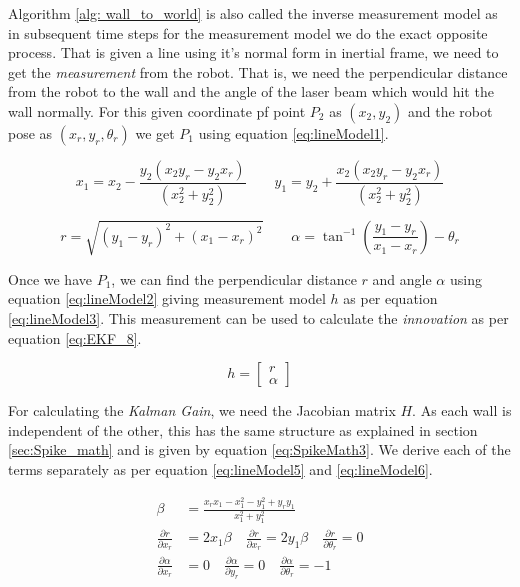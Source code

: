 Algorithm \ref{alg: wall_to_world} is also called the inverse measurement model as in subsequent time steps for the measurement model we do the exact opposite process. That is given a line using it's normal form in inertial frame, we need to get the \textit{measurement} from the robot. That is, we need the perpendicular distance from the robot to the wall and the angle of the laser beam which would hit the wall normally. For this given coordinate pf point $ P_2 $ as $ (x_2,y_2) $ and the robot pose as $ (x_r,y_r,\theta_r) $ we get $ P_1 $ using equation \ref{eq:lineModel1}. 

\begin{equation}
	\label{eq:lineModel1}
	x_1 = x_2 - \frac{y_2 ( x_2 y_ r- y_2 x_r)}{(x_2^2 + y_2^2)}
	\qquad
	y_1 = y_2 + \frac{x_2 ( x_2 y_ r- y_2 x_r)}{(x_2^2 + y_2^2)}
\end{equation}

\begin{equation}
	\label{eq:lineModel2}
	r=\sqrt{(y_1-y_r)^2+(x_1-x_r)^2}
	\qquad
	\alpha = \tan^{-1}\left(\frac{y_1-y_r}{x_1-x_r}\right)-\theta_r
\end{equation}

Once we have $ P_1 $, we can find the perpendicular distance $ r $ and angle $ \alpha $ using equation \ref{eq:lineModel2} giving measurement model $ h $ as per equation \ref{eq:lineModel3}. This measurement can be used to calculate the \textit{innovation} as per equation \ref{eq:EKF_8}. 

\begin{equation}
	\label{eq:lineModel3}
	h=\begin{bmatrix}
	r\\\alpha
	\end{bmatrix}
\end{equation}

For calculating the \textit{Kalman Gain}, we need the Jacobian matrix $ H $. As each wall is independent of the other, this has the same structure as explained in section \ref{sec:Spike_math} and is given by equation \ref{eq:SpikeMath3}. We derive each of the terms separately as per equation \ref{eq:lineModel5} and \ref{eq:lineModel6}.  

\begin{subequations}
\label{eq:lineModel5}
	\begin{align}
	\beta &= \frac{x_rx_1-x_1^2-y_1^2+y_ry_1}{x_1^2+y_1^2}\\
	\frac{\partial r}{\partial x_r} &= 2x_1\beta \quad
	\frac{\partial r}{\partial x_r} = 2y_1\beta \quad
	\frac{\partial r}{\partial \theta_r} = 0 \\
	\frac{\partial \alpha}{\partial x_r} &= 0 \quad 
	\frac{\partial \alpha}{\partial y_r} = 0 \quad 
	\frac{\partial \alpha}{\partial \theta_r} = -1
	\end{align}
\end{subequations}

